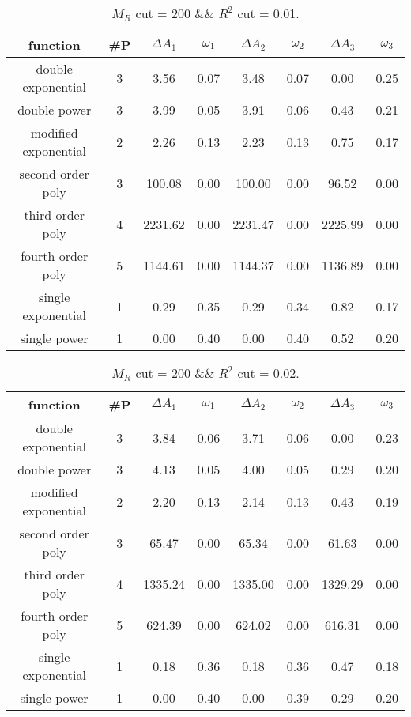  
\begin{table}[H] 
\begin{center} 
\begin{tabular}{|c|c|cc|cc|cc|} 
\hline function & \#P & $\Delta A_1$ & $\omega_1$ & $\Delta A_2$ & $\omega_2$ & $\Delta A_3$ & $\omega_3$ \\ \hline 
double exponential &  3 &   3.56 &   0.07 &   3.48 &   0.07 &   0.00 &   0.25 \\ 
double power &  3 &   3.99 &   0.05 &   3.91 &   0.06 &   0.43 &   0.21 \\ 
modified exponential &  2 &   2.26 &   0.13 &   2.23 &   0.13 &   0.75 &   0.17 \\ 
second order poly &  3 & 100.08 &   0.00 & 100.00 &   0.00 &  96.52 &   0.00 \\ 
third order poly &  4 & 2231.62 &   0.00 & 2231.47 &   0.00 & 2225.99 &   0.00 \\ 
fourth order poly &  5 & 1144.61 &   0.00 & 1144.37 &   0.00 & 1136.89 &   0.00 \\ 
single exponential &  1 &   0.29 &   0.35 &   0.29 &   0.34 &   0.82 &   0.17 \\ 
single power &  1 &   0.00 &   0.40 &   0.00 &   0.40 &   0.52 &   0.20 \\ 
\hline 
\end{tabular} 
\caption{$M_R$ cut = 200 \&\& $R^2$ cut = 0.01.} 
\label{tab:FitChoices_200_0.01} 
\end{center} 
\end{table} 
 
 
\begin{table}[H] 
\begin{center} 
\begin{tabular}{|c|c|cc|cc|cc|} 
\hline function & \#P & $\Delta A_1$ & $\omega_1$ & $\Delta A_2$ & $\omega_2$ & $\Delta A_3$ & $\omega_3$ \\ \hline 
double exponential &  3 &   3.84 &   0.06 &   3.71 &   0.06 &   0.00 &   0.23 \\ 
double power &  3 &   4.13 &   0.05 &   4.00 &   0.05 &   0.29 &   0.20 \\ 
modified exponential &  2 &   2.20 &   0.13 &   2.14 &   0.13 &   0.43 &   0.19 \\ 
second order poly &  3 &  65.47 &   0.00 &  65.34 &   0.00 &  61.63 &   0.00 \\ 
third order poly &  4 & 1335.24 &   0.00 & 1335.00 &   0.00 & 1329.29 &   0.00 \\ 
fourth order poly &  5 & 624.39 &   0.00 & 624.02 &   0.00 & 616.31 &   0.00 \\ 
single exponential &  1 &   0.18 &   0.36 &   0.18 &   0.36 &   0.47 &   0.18 \\ 
single power &  1 &   0.00 &   0.40 &   0.00 &   0.39 &   0.29 &   0.20 \\ 
\hline 
\end{tabular} 
\caption{$M_R$ cut = 200 \&\& $R^2$ cut = 0.02.} 
\label{tab:FitChoices_200_0.02} 
\end{center} 
\end{table} 
 
